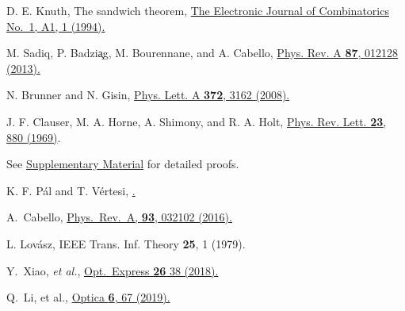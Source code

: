 \documentclass[prl,letterpaper,english,reprint,nofootinbib,aps,superscriptaddress,showpacs,showkeys]{revtex4-1}
\theoremstyle{definition}
\theoremstyle{remark}
\begin{document}
\begin{thebibliography}{10}
D. E. Knuth,
The sandwich theorem,
\href{http://www.combinatorics.org/ojs/index.php/eljc/article/view/v1i1a1}{The Electronic Journal of Combinatorics No.\ 1, A1, 1 (1994).}


 M. Sadiq, P. Badzi{\c a}g, M. Bourennane, and A. Cabello,
 \href{http://pra.aps.org/abstract/PRA/v87/i1/e012128}{Phys. Rev. A \textbf{87}, 012128 (2013).}

 N. Brunner and N. Gisin,
 \href{http://dx.doi.org/10.1016/j.physleta.2008.01.052}{Phys. Lett. A \textbf{372}, 3162 (2008).}


J. F. Clauser, M. A. Horne, A. Shimony, and R. A. Holt,
\href{https://journals.aps.org/prl/abstract/10.1103/PhysRevLett.23.880}{Phys. Rev. Lett. \textbf{23}, 880 (1969)}.


See \href{https://journals.aps.org/} {Supplementary Material} for detailed proofs.


 K. F. P\'al and T. V\'ertesi,
 \href{https://dx.doi.org/10.1103/PhysRevA.82.022116}{.}










 A.~Cabello,
 \href{https://journals.aps.org/pra/pdf/10.1103/PhysRevA.93.032102}
 {Phys.~Rev.~A, \textbf{93}, 032102 (2016).}

L. Lov\'asz,
IEEE Trans. Inf. Theory \textbf{25}, 1 (1979).

 Y.~Xiao, \emph{et al.},
 \href{https://www.osapublishing.org/oe/abstract.cfm?uri=oe-26-1-32}
 {Opt.~Express \textbf{26} 38 (2018).}

 Q.~Li, et al.,
 \href{https://www.osapublishing.org/optica/abstract.cfm?uri=optica-6-1-67&origin=search}
 {Optica \textbf{6}, 67 (2019).}


\end{thebibliography}
\end{document}
